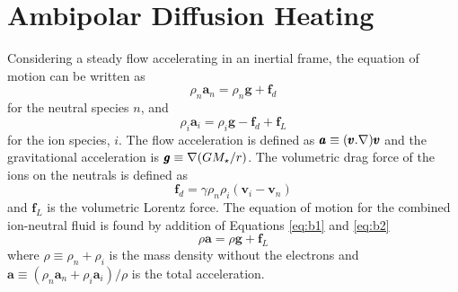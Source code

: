 
\chapter{Ambipolar Diffusion Heating}\label{app:3}

Considering a steady flow accelerating in an inertial frame, the equation of motion can be written as
\begin{equation}\label{eq:b1}
\rho _{n}\pmb{a}_{n} = \rho _{n}\pmb{g} + \pmb{f}_{d}
\end{equation}
for the neutral species $n$, and 
\begin{equation}\label{eq:b2}
\rho _{i}\pmb{a}_{i} = \rho _{i}\pmb{g} - \pmb{f}_{d} + \pmb{f} _{L}
\end{equation}
for the ion species, $i$. The flow acceleration is defined as $\pmb{a}\equiv (\pmb{v}.{\bf \nabla } )\pmb{v}$ and the gravitational acceleration is $\pmb{g} \equiv {\bf \nabla } (GM_{\star}/r)$. The volumetric drag force of the ions on the neutrals is defined as
\begin{equation}\label{eq:b3}
\pmb{f}_{d}=\gamma \rho _{n}\rho _{i}(\pmb{v}_{i}-\pmb{v}_{n})
\end{equation}
and $\pmb{f} _{L}$ is the volumetric Lorentz force. The equation of motion for the combined ion-neutral fluid is found by addition of Equations \ref{eq:b1} and \ref{eq:b2}
\begin{equation}
\rho \pmb{a} = \rho \pmb{g} +  \pmb{f} _{L}
\end{equation}
where $\rho \equiv \rho _{n} + \rho _{i}$ is the mass density without the electrons and $\pmb{a} \equiv (\rho _n\pmb{a}_{n} + \rho _{i}\pmb{a}_{i})/\rho$ is the total acceleration.

